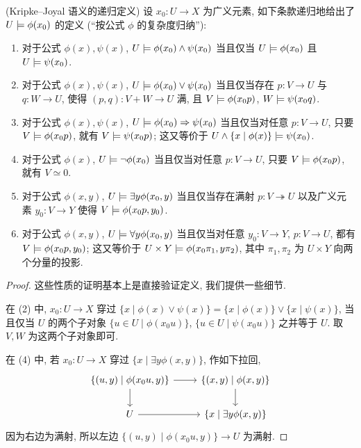 \begin{propdef}
	[label={Kripke--Joyal-recursive-definition}]
	{(Kripke--Joyal 语义的递归定义)}
	设 $x_0 \colon U\to X$ 为广义元素, 如下条款递归地给出了 $U\models\phi(x_0)$ 的定义 (``按公式 $\phi$ 的复杂度归纳''):
	\begin{enumerate}[(1)]
		\item 对于公式 $\phi(x), \psi(x)$, $U\models \phi(x_0) \land \psi(x_0)$ 当且仅当 $U\models \phi(x_0)$ 且 $U\models\psi(x_0)$.
		\item 对于公式 $\phi(x), \psi(x)$, $U\models \phi(x_0) \lor \psi(x_0)$ 当且仅当存在 $p\colon V\to U$ 与 $q\colon W\to U$,
		使得 $(p,q)\colon V+W\to U$ 满, 且 $V\models \phi(x_0 p)$, $W\models\psi(x_0 q)$.
		\item 对于公式 $\phi(x), \psi(x)$, $U\models \phi(x_0) \Rightarrow \psi(x_0)$ 当且仅当对任意 $p\colon V\to U$, 只要 $V\models \phi(x_0 p)$, 就有 $V\models \psi(x_0p)$; 这又等价于 $U\land\{x\mid \phi(x)\}\models \psi(x_0)$.
		\item 对于公式 $\phi(x)$, $U\models \neg\phi(x_0)$ 当且仅当对任意 $p\colon V\to U$, 只要 $V\models\phi(x_0p)$, 就有 $V\simeq 0$.
		\item 对于公式 $\phi(x,y)$, $U \models \exists y \phi(x_0,y)$ 当且仅当存在满射 $p\colon V\twoheadrightarrow U$ 以及广义元素 $y_0\colon V\to Y$ 使得 $V\models \phi(x_0p,y_0)$.
		\item 对于公式 $\phi(x,y)$, $U \models \forall y \phi(x_0,y)$ 当且仅当对任意 $y_0\colon V\to Y$, $p\colon V\to U$, 都有 $V\models \phi(x_0p,y_0)$; 这又等价于 $U\times Y \models \phi(x_0\pi_1,y\pi_2)$, 其中 $\pi_1,\pi_2$ 为 $U\times Y$ 向两个分量的投影.
	\end{enumerate}
\end{propdef}
\begin{proof}
	这些性质的证明基本上是直接验证定义, 我们提供一些细节.
	
	在 (2) 中, $x_0\colon U\to X$ 穿过 $\{x\mid\phi(x)\lor\psi(x)\} = \{x\mid\phi(x)\}\lor\{x\mid\psi(x)\}$,
	当且仅当 $U$ 的两个子对象 $\{u\in U\mid \phi(x_0u)\}$, $\{u\in U\mid \psi(x_0u)\}$ 之并等于 $U$.
	取 $V,W$ 为这两个子对象即可.
	
	在 (4) 中, 若 $x_0\colon U\to X$ 穿过 $\{x\mid \exists y \phi(x,y)\}$, 作如下拉回,
	\[\begin{tikzcd}[ampersand replacement=\&]
		{\{(u,y)\mid\phi(x_0u,y)\}} \& {\{(x,y)\mid\phi(x,y)\}} \\
		U \& {\{x\mid\exists y\phi(x,y)\}}
		\arrow[from=1-1, to=2-1]
		\arrow[from=1-1, to=1-2]
		\arrow[from=2-1, to=2-2]
		\arrow[from=1-2, to=2-2]
	\end{tikzcd}\]
	因为右边为满射, 所以左边 $\{(u,y)\mid \phi(x_0u,y)\}\to U$ 为满射.
\end{proof}

